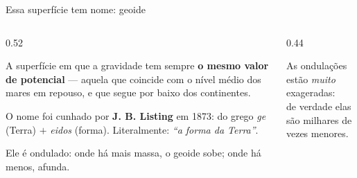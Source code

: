 \documentclass[aspectratio=169,11pt]{beamer}
\newcommand{\bnum}[1]{\textbf{\textcolor{mTeal}{#1}}}
\begin{document}
\begin{frame}{Essa superfície tem nome: geoide}
  \begin{columns}[T]
    \begin{column}{0.52\textwidth}
      \begin{ideia}[title={Geoide}]
        A superfície em que a gravidade tem sempre \bnum{o mesmo valor de potencial} ---
        aquela que coincide com o nível médio dos mares em repouso, e que segue por baixo
        dos continentes.
      \end{ideia}
      \medskip

      O nome foi cunhado por \textbf{J. B. Listing} em 1873: do grego \emph{ge} (Terra)
      $+$ \emph{eidos} (forma). Literalmente: \emph{``a forma da Terra''}.
      \medskip

      Ele é \alert{ondulado}: onde há mais massa, o geoide sobe; onde há menos, afunda.
    \end{column}
    \begin{column}{0.44\textwidth}
      \centering
      \smallskip

      {\scriptsize\textcolor{mStoneMid}{As ondulações estão \emph{muito} exageradas:\\
      de verdade elas são milhares de vezes menores.}}
    \end{column}
  \end{columns}
\end{frame}
\end{document}
